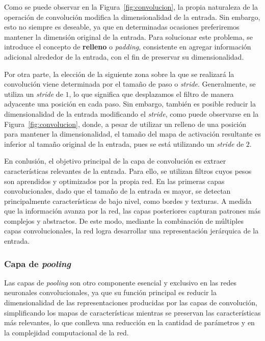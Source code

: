 Como se puede observar en la Figura~\ref{fig:convolucion}, la propia naturaleza de la operación de convolución modifica la dimensionalidad de la entrada. Sin embargo, esto no siempre es deseable, ya que en determinadas ocasiones preferiremos mantener la dimensión original de la entrada. Para solucionar este problema, se introduce el concepto de \textbf{relleno} o \emph{padding}, consistente en agregar información adicional alrededor de la entrada, con el fin de preservar su dimensionalidad.

Por otra parte, la elección de la siguiente zona sobre la que se realizará la convolución viene determinada por el tamaño de paso o \emph{stride}. Generalmente, se utiliza un \textit{stride} de $1$, lo que significa que desplazamos el filtro de manera adyacente una posición en cada paso. Sin embargo, también es posible reducir la dimensionalidad de la entrada modificando el \textit{stride}, como puede observarse en la Figura~\ref{fig:convolucion}, donde, a pesar de utilizar un relleno de una posición para mantener la dimensionalidad, el tamaño del mapa de activación resultante es inferior al tamaño original de la entrada, pues se está utilizando un \textit{stride} de $2$.

En conlusión, el objetivo principal de la capa de convolución es extraer características relevantes de la entrada. Para ello, se utilizan filtros cuyos pesos son aprendidos y optimizados por la propia red. En las primeras capas convolucionales, dado que el tamaño de la entrada es mayor, se detectan principalmente características de bajo nivel, como bordes y texturas. A medida que la información avanza por la red, las capas posteriores capturan patrones más complejos y abstractos. De este modo, mediante la combinación de múltiples capas convolucionales, la red logra desarrollar una representación jerárquica de la entrada.

\subsubsection{Capa de \textit{pooling}}

Las capas de \textit{pooling} son otro componente esencial y exclusivo en las redes neuronales convolucionales, ya que su función principal es reducir la dimensionalidad de las representaciones producidas por las capas de convolución, simplificando los mapas de características mientras se preservan las características más relevantes, lo que conlleva una reducción en la cantidad de parámetros y en la complejidad computacional de la red.

